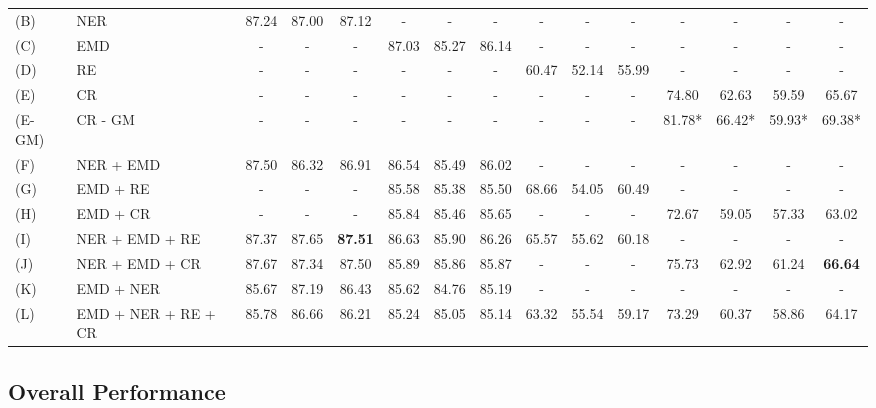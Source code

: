 \documentclass[letterpaper]{article}
\begin{document}
\begin{table}
{\begin{tabular}{|l l|| c|c|c || c|c|c || c|c|c || c|c|c|c |}
       \hline
       (B) & NER
            & 87.24 & 87.00 & 87.12
            & - & - & -
            & - & - & -
            & - & - & - & - \\
        (C) & EMD
            & - & - & -
            & 87.03 & 85.27 & 86.14
            & - & - & -
            & - & - & - & - \\
        (D) & RE
            & - & - & -
            & - & - & -
            & 60.47 & 52.14 & 55.99
            & - & - & - & - \\
        (E) & CR
            & - & - & -
            & - & - & -
            & - & - & -
            & 74.80 & 62.63 & 59.59 & 65.67 \\
        (E-GM) & CR - GM
            & - & - & -
            & - & - & -
            & - & - & -
            & 81.78* & 66.42* & 59.93* & 69.38* \\
        \hline
        (F) & NER + EMD
            & 87.50 & 86.32 & 86.91
            & 86.54 & 85.49 & 86.02
            & - & - & -
            & - & - & - & - \\
        (G) & EMD + RE
            & - & - & -
            & 85.58 & 85.38 & 85.50
            & 68.66 & 54.05 & 60.49
            & - & - & - & - \\
        (H) & EMD + CR
            & - & - & -
            & 85.84 & 85.46 & 85.65
            & - & - & -
            & 72.67 & 59.05 & 57.33 & 63.02 \\
        \hline
        (I) & NER + EMD + RE
            & 87.37 & 87.65 & \textbf{87.51}
            & 86.63 & 85.90 & 86.26
            & 65.57 & 55.62 & 60.18
            & - & - & - & - \\
        (J) & NER + EMD + CR
            & 87.67 & 87.34 & 87.50
            & 85.89 & 85.86 & 85.87
            & - & - & -
            & 75.73 & 62.92 & 61.24 & \textbf{66.64} \\
        \hline
        (K) & EMD + NER
            & 85.67 & 87.19 & 86.43
            & 85.62 & 84.76 & 85.19
            & - & - & -
            & - & - & - & - \\
        (L) & EMD + NER + RE + CR
            & 85.78 & 86.66 & 86.21
            & 85.24 & 85.05 & 85.14
            & 63.32 & 55.54 & 59.17
            & 73.29 & 60.37 & 58.86 & 64.17 \\
        \hline
    \end{tabular}%
}
\end{table}

\subsection{Overall Performance}
\end{document}
